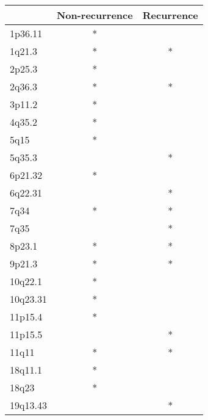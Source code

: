 \begin{tabular}{lcc}
\toprule
{} & Non-recurrence & Recurrence \\
\midrule
1p36.11  &              * &            \\
1q21.3   &              * &          * \\
2p25.3   &              * &            \\
2q36.3   &              * &          * \\
3p11.2   &              * &            \\
4q35.2   &              * &            \\
5q15     &              * &            \\
5q35.3   &                &          * \\
6p21.32  &              * &            \\
6q22.31  &                &          * \\
7q34     &              * &          * \\
7q35     &                &          * \\
8p23.1   &              * &          * \\
9p21.3   &              * &          * \\
10q22.1  &              * &            \\
10q23.31 &              * &            \\
11p15.4  &              * &            \\
11p15.5  &                &          * \\
11q11    &              * &          * \\
18q11.1  &              * &            \\
18q23    &              * &            \\
19q13.43 &                &          * \\
\bottomrule
\end{tabular}
